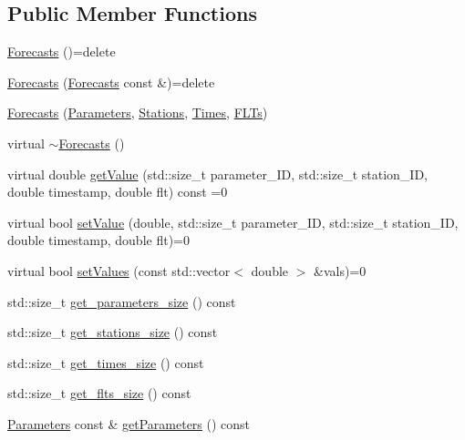 \subsection*{Public Member Functions}
\begin{DoxyCompactItemize}
\item 
\mbox{\hyperlink{class_forecasts_a0e602a4bb37b4d6092f475da8c20ed27}{Forecasts}} ()=delete
\item 
\mbox{\hyperlink{class_forecasts_a6f47e34b9ae9bb9496149208e3246d65}{Forecasts}} (\mbox{\hyperlink{class_forecasts}{Forecasts}} const \&)=delete
\item 
\mbox{\hyperlink{class_forecasts_a9a7ee86b148267a59aec821e44d5f7d9}{Forecasts}} (\mbox{\hyperlink{class_parameters}{Parameters}}, \mbox{\hyperlink{class_stations}{Stations}}, \mbox{\hyperlink{class_times}{Times}}, \mbox{\hyperlink{class_f_l_ts}{F\+L\+Ts}})
\item 
virtual \mbox{\hyperlink{class_forecasts_a340fd19812d62efc334fe4d23ff8dcd2}{$\sim$\+Forecasts}} ()
\item 
virtual double \mbox{\hyperlink{class_forecasts_a07a51e97b54a5c42d197fb4804ee43bc}{get\+Value}} (std\+::size\+\_\+t parameter\+\_\+\+ID, std\+::size\+\_\+t station\+\_\+\+ID, double timestamp, double flt) const =0
\item 
virtual bool \mbox{\hyperlink{class_forecasts_ac3ba966466c340deaecf83fa239bef6d}{set\+Value}} (double, std\+::size\+\_\+t parameter\+\_\+\+ID, std\+::size\+\_\+t station\+\_\+\+ID, double timestamp, double flt)=0
\item 
virtual bool \mbox{\hyperlink{class_forecasts_a2f249a4ec8571dcf2cfc23f06b942ad9}{set\+Values}} (const std\+::vector$<$ double $>$ \&vals)=0
\item 
std\+::size\+\_\+t \mbox{\hyperlink{class_forecasts_a445efc69dce930a1c308d17289466e68}{get\+\_\+parameters\+\_\+size}} () const
\item 
std\+::size\+\_\+t \mbox{\hyperlink{class_forecasts_abec05f11da96ef797e741178b2a7335c}{get\+\_\+stations\+\_\+size}} () const
\item 
std\+::size\+\_\+t \mbox{\hyperlink{class_forecasts_a267f33699ada17b57e2c05a25a01d1c3}{get\+\_\+times\+\_\+size}} () const
\item 
std\+::size\+\_\+t \mbox{\hyperlink{class_forecasts_a5cea0e9e7f39a95a26878fefc0c29b7b}{get\+\_\+flts\+\_\+size}} () const
\item 
\mbox{\hyperlink{class_parameters}{Parameters}} const  \& \mbox{\hyperlink{class_forecasts_a3f3bfa7ff06856f8e965fd440fa2f4ae}{get\+Parameters}} () const

\end{DoxyCompactItemize}
